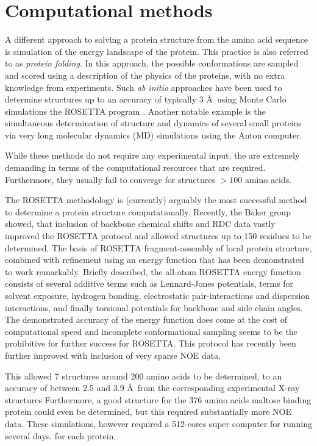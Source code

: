\section{Computational methods}
A different approach to solving a protein structure from the amino acid sequence is simulation of the energy landscape of the protein.
This practice is also referred to as \textit{protein folding}.
In this approach, the possible conformations are sampled and scored using a description of the physics of the proteins, with no extra knowledge from experiments.
Such \textit{ab initio} approaches have been used to determine structures up to an accuracy of typically 3 \AA~using Monte Carlo simulations the ROSETTA program \cite{rosetta}.
Another notable example is the simultaneous determination of structure and dynamics of several small proteins via very long molecular dynamics (MD) simulations using the Anton computer\cite{rdcensemble}.

While these methods do not require any experimental input, the are extremely demanding in terms of the computational resources that are required.
Furthermore, they usually fail to converge for structures $>100$ amino acids\cite{Lange2012}.

The ROSETTA methodology is (currently) arguably the most successful method to determine a protein structure computationally.
Recently, the Baker group showed, that inclusion of backbone chemical shifts and RDC data vastly improved the ROSETTA protocol and allowed structures up to 150 residues to be determined\cite{Baker2010,Lange2012}.
The basis of ROSETTA fragment-assembly of local protein structure, combined with  refinement using an energy function that has been demonstrated to work remarkably.
Briefly described, the all-atom ROSETTA energy function consists of several additive terms such as Lennard-Jones potentials, terms for solvent exposure, hydrogen bonding, electrostatic pair-interactions and dispersion interactions, and finally torsional potentials for backbone and side chain angles.
The demonstrated accuracy of the energy function does come at the cost of computational speed and incomplete conformational sampling seems to be the prohibitive for further success for ROSETTA.
This protocol has recently been further improved with inclusion of very sparse NOE data\cite{LangePNAS2012}.

This allowed 7 structures around 200 amino acids to be determined, to an accuracy of between 2.5 and 3.9 \AA~from the corresponding experimental X-ray structures
Furthermore, a good structure for the 376 amino acids maltose binding protein could even be determined, but this required substantially more NOE data.
These simulations, however required a 512-cores super computer for running several days, for each protein.


